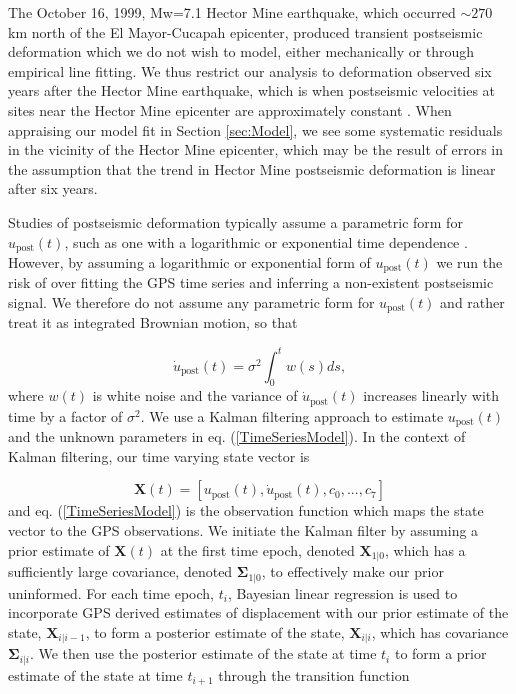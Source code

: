 \documentclass[draft,linenumbers]{AGUJournal}
\begin{document}
The October 16, 1999, Mw=7.1 Hector Mine earthquake, which occurred ${\sim}270$ km north of the El Mayor-Cucapah epicenter, produced transient postseismic deformation which we do not wish to model, either mechanically or through empirical line fitting.  We thus restrict our analysis to deformation observed six years after the Hector Mine earthquake, which is when postseismic velocities at sites near the Hector Mine epicenter are approximately constant \citep{Savage2009}. When appraising our model fit in Section \ref{sec:Model}, we see some systematic residuals in the vicinity of the Hector Mine epicenter, which may be the result of errors in the assumption that the trend in Hector Mine postseismic deformation is linear after six years.   

Studies of postseismic deformation typically assume a parametric form for $u_\mathrm{post}(t)$, such as one with a logarithmic or exponential time dependence \citep[e.g.][]{Savage2005a}.  However, by assuming a logarithmic or exponential form of $u_\mathrm{post}(t)$ we run the risk of over fitting the GPS time series and inferring a non-existent postseismic signal. We therefore do not assume any parametric form for $u_\mathrm{post}(t)$ and rather treat it as integrated Brownian motion, so that 

\begin{equation}
    \dot{u}_\mathrm{post}(t) = \sigma^2\int_0^t w(s) ds,
\end{equation}    
where $w(t)$ is white noise and the variance of $\dot{u}_\mathrm{post}(t)$ increases linearly with time by a factor of $\sigma^2$. We use a Kalman filtering approach to estimate $u_\mathrm{post}(t)$ and the unknown parameters in eq. (\ref{TimeSeriesModel}).  In the context of Kalman filtering, our time varying state vector is

\begin{equation}
    \mathbf{X}(t) = [u_\mathrm{post}(t),\dot u_\mathrm{post}(t), c_0, ..., c_7]
\end{equation}
and eq. (\ref{TimeSeriesModel}) is the observation function which maps the state vector to the GPS observations. We initiate the Kalman filter by assuming a prior estimate of $\mathbf{X}(t)$ at the first time epoch, denoted $\mathbf{X}_{1|0}$, which has a sufficiently large covariance, denoted $\mathbf{\Sigma}_{1|0}$, to effectively make our prior uninformed.  For each time epoch, $t_i$, Bayesian linear regression is used to incorporate GPS derived estimates of displacement with our prior estimate of the state, $\mathbf{X}_{i|i-1}$, to form a posterior estimate of the state, $\mathbf{X}_{i|i}$, which has covariance $\mathbf{\Sigma}_{i|i}$.  We then use the posterior estimate of the state at time $t_i$ to form a prior estimate of the state at time $t_{i+1}$ through the transition function
\end{document}
